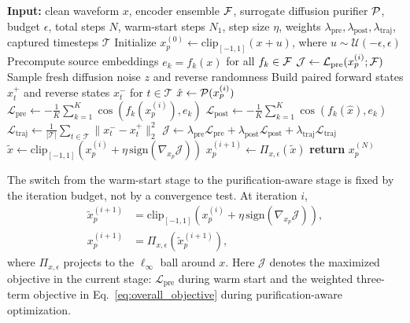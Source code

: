\begin{algorithm}[t]
\caption{\method{} staged optimization}
\label{alg:purguard}
\begin{algorithmic}[1]
\STATE \textbf{Input:} clean waveform $x$, encoder ensemble $\mathcal{F}$, surrogate diffusion purifier $\mathcal{P}$, 
budget $\epsilon$, total steps $N$, warm-start steps $N_1$, step size $\eta$, weights $\lambda_{\text{pre}},\lambda_{\text{post}},\lambda_{\text{traj}}$, captured timesteps $\mathcal{T}$
\STATE Initialize $x_p^{(0)} \leftarrow \mathrm{clip}_{[-1,1]}(x+u)$, where $u\sim\mathcal{U}(-\epsilon,\epsilon)$
\STATE Precompute source embeddings $e_k=f_k(x)$ for all $f_k\in\mathcal{F}$
        \STATE $\mathcal{J}\leftarrow\mathcal{L}_{\text{pre}}(x_p^{(i)};\mathcal{F})$
    \ELSE
        \STATE Sample fresh diffusion noise $z$ and reverse randomness
        \STATE Build paired forward states $x_t^{+}$ and reverse states $x_t^{-}$ for $t\in\mathcal{T}$
        \STATE $\hat{x}\leftarrow\mathcal{P}(x_p^{(i)})$
        \STATE $\mathcal{L}_{\text{pre}}\leftarrow-\frac{1}{K}\sum_{k=1}^{K}\cos(f_k(x_p^{(i)}),e_k)$
        \STATE $\mathcal{L}_{\text{post}}\leftarrow-\frac{1}{K}\sum_{k=1}^{K}\cos(f_k(\hat{x}),e_k)$
        \STATE $\mathcal{L}_{\text{traj}}\leftarrow\frac{1}{|\mathcal{T}|}\sum_{t\in\mathcal{T}}\|x_t^{-}-x_t^{+}\|_2^2$
        \STATE $\mathcal{J}\leftarrow\lambda_{\text{pre}}\mathcal{L}_{\text{pre}}+\lambda_{\text{post}}\mathcal{L}_{\text{post}}+\lambda_{\text{traj}}\mathcal{L}_{\text{traj}}$
    \ENDIF
    \STATE $\tilde{x}\leftarrow\mathrm{clip}_{[-1,1]}\!\left(x_p^{(i)}+\eta\,\mathrm{sign}(\nabla_{x_p}\mathcal{J})\right)$
    \STATE $x_p^{(i+1)}\leftarrow\Pi_{x,\epsilon}(\tilde{x})$
\ENDFOR
\STATE \textbf{return} $x_p^{(N)}$
\end{algorithmic}
\end{algorithm}

The switch from the warm-start stage to the purification-aware stage is fixed by the iteration budget, not by a convergence test. At iteration $i$,
\begin{equation}
    \begin{aligned}
    \tilde{x}_p^{(i+1)}
    &=
    \mathrm{clip}_{[-1,1]}
    \left(x_p^{(i)}+\eta\,\mathrm{sign}(\nabla_{x_p}\mathcal{J})\right),\\
    x_p^{(i+1)}
    &=\Pi_{x,\epsilon}\left(\tilde{x}_p^{(i+1)}\right),
    \end{aligned}
\end{equation}
where $\Pi_{x,\epsilon}$ projects to the $\ell_{\infty}$ ball around $x$.
Here $\mathcal{J}$ denotes the maximized objective in the current stage: $\mathcal{L}_{\text{pre}}$ during warm start and the weighted three-term objective in Eq.~\eqref{eq:overall_objective} during purification-aware optimization.

